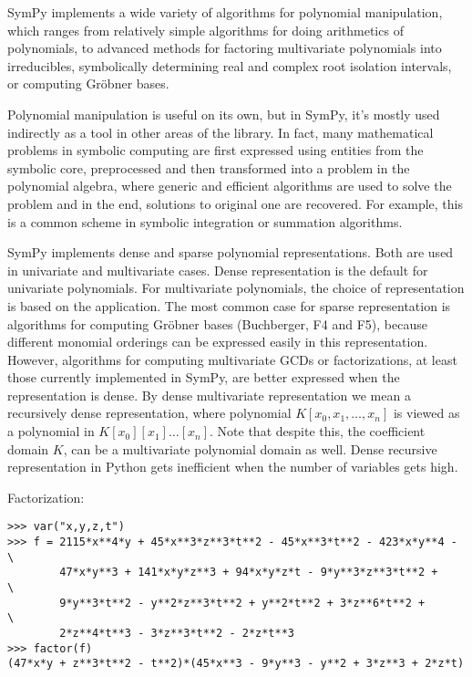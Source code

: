 
SymPy implements a wide variety of algorithms for polynomial manipulation,
which ranges from relatively simple algorithms for doing arithmetics of
polynomials, to advanced methods for factoring multivariate polynomials
into irreducibles, symbolically determining real and complex root isolation
intervals, or computing Gröbner bases.

Polynomial manipulation is useful on its own, but in SymPy, it's mostly
used indirectly as a tool in other areas of the library. In fact, many
mathematical problems in symbolic computing are first expressed using
entities from the symbolic core, preprocessed and then transformed into
a problem in the polynomial algebra, where generic and efficient algorithms
are used to solve the problem and in the end, solutions to original one
are recovered. For example, this is a common scheme in symbolic integration
or summation algorithms.

SymPy implements dense and sparse polynomial representations. Both
are used in univariate and multivariate cases. Dense representation is
the default for univariate polynomials. For multivariate polynomials,
the choice of representation is based on the application. The most common
case for sparse representation is algorithms for computing Gröbner bases
(Buchberger, F4 and F5), because different monomial orderings can be
expressed easily in this representation. However, algorithms for computing
multivariate GCDs or factorizations, at least those currently implemented
in SymPy, are better expressed when the representation is dense. By dense
multivariate representation we mean a recursively dense representation,
where polynomial $K[x_0, x_1,\dots, x_n]$ is viewed as a polynomial in
$K[x_0][x_1]\ldots[x_n]$. Note that despite this, the coefficient domain
$K$, can be a multivariate polynomial domain as well. Dense recursive
representation in Python gets inefficient when the number of variables
gets high.

\noindent Factorization:
\begin{verbatim}
>>> var("x,y,z,t")
>>> f = 2115*x**4*y + 45*x**3*z**3*t**2 - 45*x**3*t**2 - 423*x*y**4 - \
        47*x*y**3 + 141*x*y*z**3 + 94*x*y*z*t - 9*y**3*z**3*t**2 +    \
        9*y**3*t**2 - y**2*z**3*t**2 + y**2*t**2 + 3*z**6*t**2 +      \
        2*z**4*t**3 - 3*z**3*t**2 - 2*z*t**3
>>> factor(f)
(47*x*y + z**3*t**2 - t**2)*(45*x**3 - 9*y**3 - y**2 + 3*z**3 + 2*z*t)
\end{verbatim}


